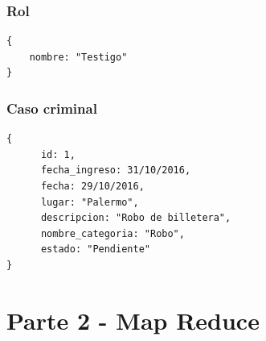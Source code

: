 \documentclass[10pt,a4paper]{article}
\begin{document}
\subsubsection{Rol}
\begin{lstlisting}
{
	nombre: "Testigo"
}
\end{lstlisting}


\subsubsection{Caso criminal}
\begin{lstlisting}
{
	  id: 1,
	  fecha_ingreso: 31/10/2016,
	  fecha: 29/10/2016,
	  lugar: "Palermo",
	  descripcion: "Robo de billetera",
	  nombre_categoria: "Robo",
	  estado: "Pendiente"
}
\end{lstlisting}

\section{Parte 2 - Map Reduce}
\end{document}
